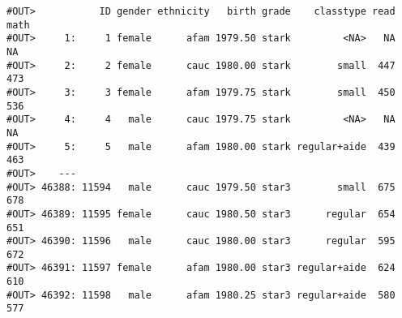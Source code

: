 \documentclass[]{book}
\newenvironment{Shaded}{\begin{snugshade}}{\end{snugshade}}
\newcommand{\CommentTok}[1]{\textcolor[rgb]{0.56,0.35,0.01}{\textit{#1}}}
\newcommand{\DataTypeTok}[1]{\textcolor[rgb]{0.13,0.29,0.53}{#1}}
\newcommand{\DecValTok}[1]{\textcolor[rgb]{0.00,0.00,0.81}{#1}}
\newcommand{\ErrorTok}[1]{\textcolor[rgb]{0.64,0.00,0.00}{\textbf{#1}}}
\newcommand{\KeywordTok}[1]{\textcolor[rgb]{0.13,0.29,0.53}{\textbf{#1}}}
\newcommand{\NormalTok}[1]{#1}
\newcommand{\OperatorTok}[1]{\textcolor[rgb]{0.81,0.36,0.00}{\textbf{#1}}}
\newcommand{\StringTok}[1]{\textcolor[rgb]{0.31,0.60,0.02}{#1}}
\begin{document}
\begin{Shaded}
\end{Shaded}

\begin{verbatim}
#OUT>           ID gender ethnicity   birth grade    classtype read math
#OUT>     1:     1 female      afam 1979.50 stark         <NA>   NA   NA
#OUT>     2:     2 female      cauc 1980.00 stark        small  447  473
#OUT>     3:     3 female      afam 1979.75 stark        small  450  536
#OUT>     4:     4   male      cauc 1979.75 stark         <NA>   NA   NA
#OUT>     5:     5   male      afam 1980.00 stark regular+aide  439  463
#OUT>    ---                                                            
#OUT> 46388: 11594   male      cauc 1979.50 star3        small  675  678
#OUT> 46389: 11595 female      cauc 1980.50 star3      regular  654  651
#OUT> 46390: 11596   male      cauc 1980.00 star3      regular  595  672
#OUT> 46391: 11597 female      afam 1980.00 star3 regular+aide  624  610
#OUT> 46392: 11598   male      afam 1980.25 star3 regular+aide  580  577
\end{verbatim}
\end{document}
